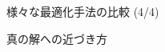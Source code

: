 \begin{frame}[t,fragile]{様々な最適化手法の比較 (4/4)}
  \begin{center}
  \end{center}
\end{frame}

\begin{frame}[t,fragile]{真の解への近づき方}
  \begin{center}
  \end{center}
\end{frame}
